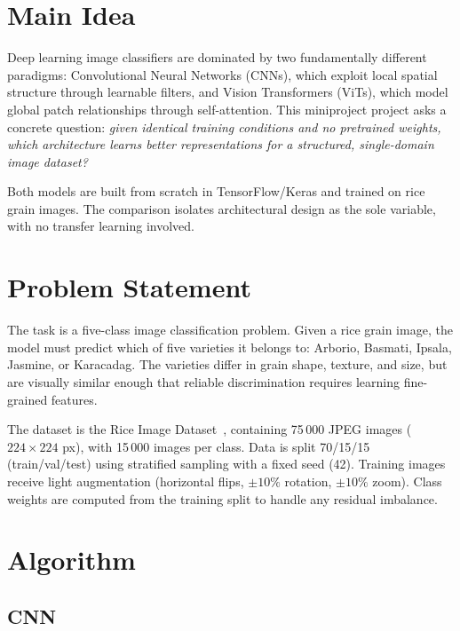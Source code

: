 \section{Main Idea}

Deep learning image classifiers are dominated by two fundamentally different
paradigms: Convolutional Neural Networks (CNNs), which exploit local spatial
structure through learnable filters, and Vision Transformers (ViTs), which model
global patch relationships through self-attention. This miniproject project asks a concrete
question: \textit{given identical training conditions and no pretrained weights,
which architecture learns better representations for a structured, single-domain
image dataset?}

Both models are built from scratch in TensorFlow/Keras and trained on rice grain
images. The comparison isolates architectural design as the sole variable, with
no transfer learning involved.

\section{Problem Statement} 

The task is a five-class image classification problem. Given a rice grain image,
the model must predict which of five varieties it belongs to: Arborio, Basmati,
Ipsala, Jasmine, or Karacadag. The varieties differ in grain shape, texture, and
size, but are visually similar enough that reliable discrimination requires
learning fine-grained features.

The dataset is the Rice Image Dataset~\cite{rice}, containing 75\,000 JPEG
images ($224\times224$ px), with 15\,000 images per class. Data is split 70/15/15
(train/val/test) using stratified sampling with a fixed seed (42). Training images
receive light augmentation (horizontal flips, $\pm10\%$ rotation, $\pm10\%$ zoom).
Class weights are computed from the training split to handle any residual imbalance.

\section{Algorithm}

\subsection{CNN}

